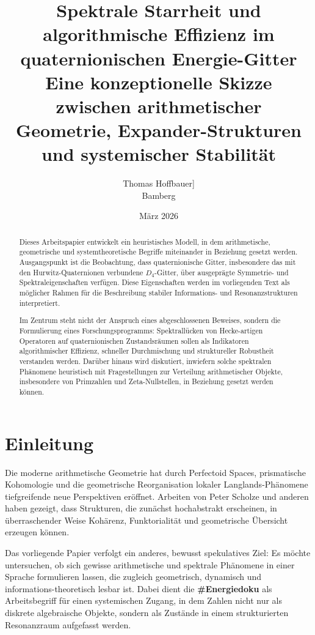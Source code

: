 \documentclass[12pt,a4paper]{article}
\title{\textbf{Spektrale Starrheit und algorithmische Effizienz im quaternionischen Energie-Gitter}\\
	\large Eine konzeptionelle Skizze zwischen arithmetischer Geometrie, Expander-Strukturen und systemischer Stabilität}
\author{Thomas Hoffbauer] \\ \small Bamberg }
\date{März 2026}
\begin{document}
	
	\maketitle
	
	\begin{abstract}
		Dieses Arbeitspapier entwickelt ein heuristisches Modell, in dem arithmetische, geometrische und systemtheoretische Begriffe miteinander in Beziehung gesetzt werden. Ausgangspunkt ist die Beobachtung, dass quaternionische Gitter, insbesondere das mit den Hurwitz-Quaternionen verbundene $D_4$-Gitter, über ausgeprägte Symmetrie- und Spektraleigenschaften verfügen. Diese Eigenschaften werden im vorliegenden Text als möglicher Rahmen für die Beschreibung stabiler Informations- und Resonanzstrukturen interpretiert.
		
		Im Zentrum steht nicht der Anspruch eines abgeschlossenen Beweises, sondern die Formulierung eines Forschungsprogramms: Spektrallücken von Hecke-artigen Operatoren auf quaternionischen Zustandsräumen sollen als Indikatoren algorithmischer Effizienz, schneller Durchmischung und struktureller Robustheit verstanden werden. Darüber hinaus wird diskutiert, inwiefern solche spektralen Phänomene heuristisch mit Fragestellungen zur Verteilung arithmetischer Objekte, insbesondere von Primzahlen und Zeta-Nullstellen, in Beziehung gesetzt werden können.
	\end{abstract}
	
	\section{Einleitung}
	
	Die moderne arithmetische Geometrie hat durch Perfectoid Spaces, prismatische Kohomologie und die geometrische Reorganisation lokaler Langlands-Phänomene tiefgreifende neue Perspektiven eröffnet. Arbeiten von Peter Scholze und anderen haben gezeigt, dass Strukturen, die zunächst hochabstrakt erscheinen, in überraschender Weise Kohärenz, Funktorialität und geometrische Übersicht erzeugen können.
	
	Das vorliegende Papier verfolgt ein anderes, bewusst spekulatives Ziel: Es möchte untersuchen, ob sich gewisse arithmetische und spektrale Phänomene in einer Sprache formulieren lassen, die zugleich geometrisch, dynamisch und informations-theoretisch lesbar ist. Dabei dient die \textbf{\#Energiedoku} als Arbeitsbegriff für einen systemischen Zugang, in dem Zahlen nicht nur als diskrete algebraische Objekte, sondern als Zustände in einem strukturierten Resonanzraum aufgefasst werden.
	
\end{document}
